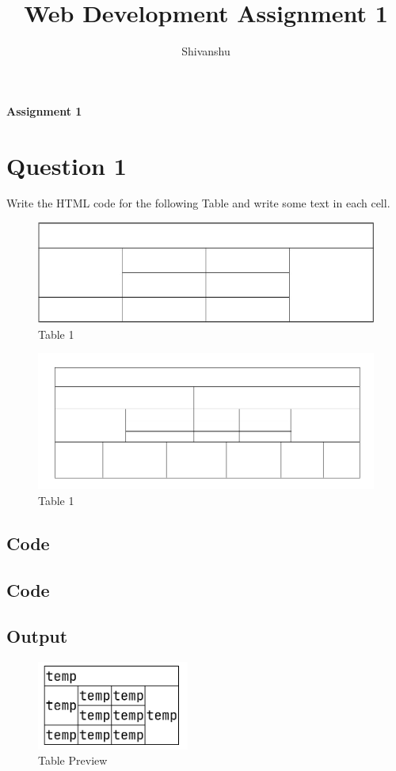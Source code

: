 \documentclass{extarticle}
\title{Web Development Assignment 1}
\author{Shivanshu}
\begin{document}

\centerline{\bfseries \Huge Assignment 1}
\section*{Question 1}

Write the HTML code for the following Table and write some text in each cell.

\begin{figure}[H]
    \caption{Table 1}
    \centering
    \includegraphics[width=15cm]{./img/a.jpg}
\end{figure}

\begin{figure}[H]
    \caption{Table 1}
    \centering
    \includegraphics[width=15cm]{./img/aa.png}
\end{figure}

\newpage
\subsection*{Code}


\newpage
\subsection*{Code}


\newpage
\subsection*{Output}
\begin{figure}[H]
    \caption{Table Preview}
    \centering
    \includegraphics[width=5cm]{1/1.png}
\end{figure}
\end{document}
